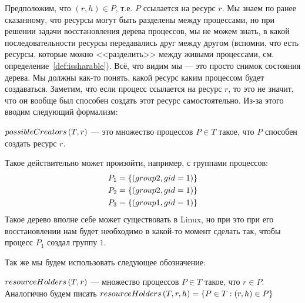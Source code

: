 Предположим, что $(r, h) \in P$, т.е. $P$ ссылается на ресурс $r$. Мы знаем по ранее сказанному, что ресурсы могут быть разделены между процессами, но при решении задачи восстановления дерева процессов, мы не можем знать, в какой последовательности ресурсы передавались друг между другом (вспомни, что есть ресурсы, которые можно <<разделить>> между живыми процессами, см. определение~\ref{def:issharable}). Всё, что видим мы --- это просто снимок состояния дерева. Мы должны как-то понять, какой ресурс каким процессом будет создаваться. Заметим, что если процесс ссылается на ресурс $r$, то это не значит, что он вообще был способен создать этот ресурс самостоятельно. Из-за этого вводим следующий формализм:

\begin{defn}
\label{def:possiblecrtrs}
$possibleCreators\left( T, r \right)$ --- это множество процессов $P \in T$ такое, что $P$ способен создать ресурс $r$.
\end{defn}

Такое действительно может произойти, например, с группами процессов: 
\begin{align*}
P_1 = \left\lbrace (group 2, gid=1) \right\rbrace \\ P_2 = \left\lbrace (group 2, gid=1) \right\rbrace \\ P_3 = \left\lbrace (group 1, gid=1) \right\rbrace
\end{align*}
Такое дерево вполне себе может существовать в Linux, но при это при его восстановлении нам будет необходимо 
в какой-то момент сделать так, чтобы процесс $P_1$ создал группу $1$.

Так же мы будем использовать следующее обозначение:

\begin{defn}
\label{def:resourceholders}
$resourceHolders\left( T, r \right)$ --- множество процессов $P \in T$ такое, что $r \in P$. Аналогично будем писать $resourceHolders\left( T, r, h \right) = \left\lbrace P \in T: (r, h) \in P \right\rbrace$
\end{defn}

